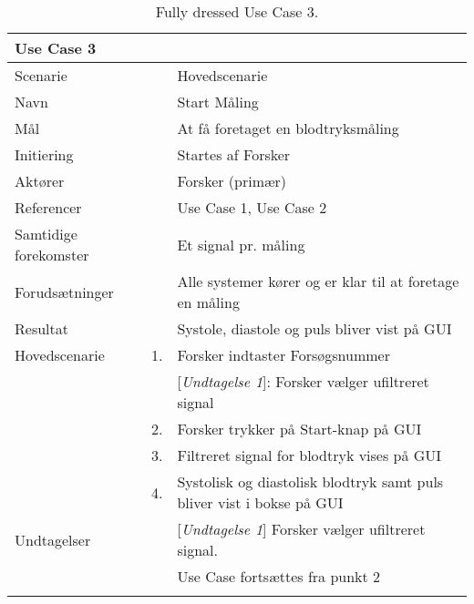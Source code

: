 \begin{longtabu} to  %
    {\large \textbf{Use Case 3}} && \\
    \toprule
    Scenarie && Hovedscenarie\\
    Navn && Start Måling\\
    Mål && At få foretaget en blodtryksmåling\\
    Initiering && Startes af Forsker\\
    Aktører && Forsker (primær)\\
    Referencer && Use Case 1, Use Case 2\\
    Samtidige forekomster  && Et signal pr. måling\\
    Forudsætninger && Alle systemer kører og er klar til at foretage en måling\\ 
    Resultat && Systole, diastole og puls bliver vist på GUI\\ \midrule
    Hovedscenarie &    1. &		Forsker indtaster Forsøgsnummer\\[-1ex]
    &     & 	[\textit{Undtagelse 1}]:	Forsker vælger ufiltreret signal 	\\	 	
                &    2. & Forsker trykker på Start-knap på GUI\\[-1ex]
                &    3. & Filtreret signal for blodtryk vises på GUI\\[-1ex]
                &    4. & Systolisk og diastolisk blodtryk samt puls bliver vist i bokse på GUI\\[-1ex] \midrule
                
    Undtagelser && [\textit{Undtagelse 1}]	Forsker vælger ufiltreret signal.\\ 
    &	 & Use Case fortsættes fra punkt 2\\ 
    \bottomrule
\caption{Fully dressed Use Case 3.}
\label{UC3}
\end{longtabu}


